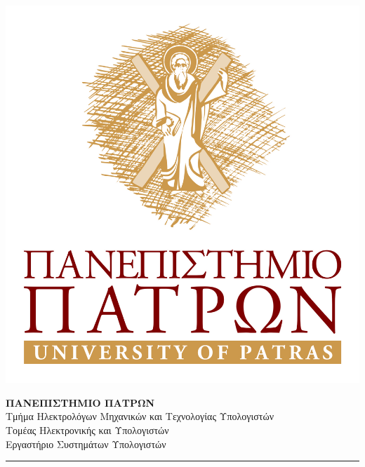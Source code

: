\begin{titlepage}
\vspace*{-2cm} 
\begin{minipage}[c]{.2\linewidth}
	\vspace*{0.55cm} 
  	\includegraphics[width=1\linewidth]{Figures/UPlogo.jpg}
\end{minipage}\hfill  	
\begin{minipage}[c]{.75\linewidth}  
  	\hfill \break
	\hfill \break

	\textsc{\Large \textbf{ΠΑΝΕΠΙΣΤΗΜΙΟ ΠΑΤΡΩΝ}}					\\
	{
		\large 
		Τμήμα Ηλεκτρολόγων Μηχανικών και Τεχνολογίας Υπολογιστών	\\
		Τομέας Ηλεκτρονικής και Υπολογιστών 						\\
		Εργαστήριο Συστημάτων Υπολογιστών
	}
\end{minipage}
  
\rule{\textwidth}{0.7pt}


\end{titlepage}
